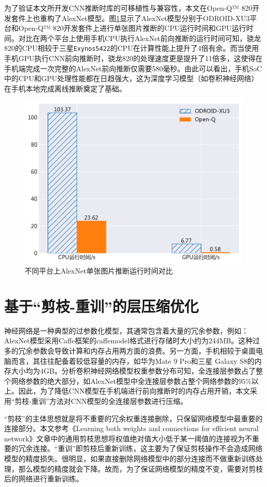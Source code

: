 为了验证本文所开发CNN推断时库的可移植性与兼容性，本文在Open-Q™ 820开发套件上也重构了AlexNet模型。图\ref{figure:figure19}显示了AlexNet模型分别于ODROID-XU3平台和Open-Q™ 820开发套件上进行单张图片推断的CPU运行时间和GPU运行时间。对比在两个平台上使用手机CPU执行AlexNet前向推断的运行时间可知，骁龙820的CPU相较于三星\texttt{Exynos5422}的CPU在计算性能上提升了4倍有余。而当使用手机GPU执行CNN前向推断时，骁龙820的处理速度更是提升了11倍多，这使得在手机端完成一次完整的AlexNet前向推断仅需要580毫秒。由此可以看出，手机SoC中的CPU和GPU处理性能都在日趋强大，这为深度学习模型（如卷积神经网络）在手机本地完成离线推断奠定了基础。

\begin{figure}[htbp]
    \centering
    \includegraphics[height=0.4\textwidth]{figures/open_q.pdf}
    \caption{不同平台上AlexNet单张图片推断运行时间对比}\label{figure:figure19}
\end{figure}


\section{基于“剪枝-重训”的层压缩优化}

神经网络是一种典型的过参数化模型，其通常包含着大量的冗余参数，例如：AlexNet模型采用Caffe框架的caffemodel格式进行存储时大小约为244MB。这种过多的冗余参数会导致计算和内存占用两方面的浪费。另一方面，手机相较于桌面电脑而言，其往往配备着较低容量的内存，如华为Mate 9 Pro和三星 Galaxy S8的内存大小均为4GB。分析卷积神经网络模型权重参数分布可知，全连接层参数占了整个网络参数的绝大部分，如AlexNet模型中全连接层参数占整个网络参数的95\%以上。因此，为了降低CNN模型在手机端进行前向推断时的内存占用开销，本文采用“剪枝-重训”方法对CNN模型的全连接层参数进行压缩。

“剪枝”的主体思想就是将不重要的冗余权重连接删除，只保留网络模型中最重要的连接部分。本文参考《Learning both weights and connections for efficient neural network》\cite{han2015learning}文章中的通用剪枝思想将权值绝对值大小低于某一阈值的连接视为不重要的冗余连接。“重训”即剪枝后重新训练，这主要为了保证剪枝操作不会造成网络模型的精度损失。很明显，如果直接删除网络模型中的部分连接而不做重新训练处理，那么模型的精度就会下降。故而，为了保证网络模型的精度不变，需要对剪枝后的网络进行重新训练。

